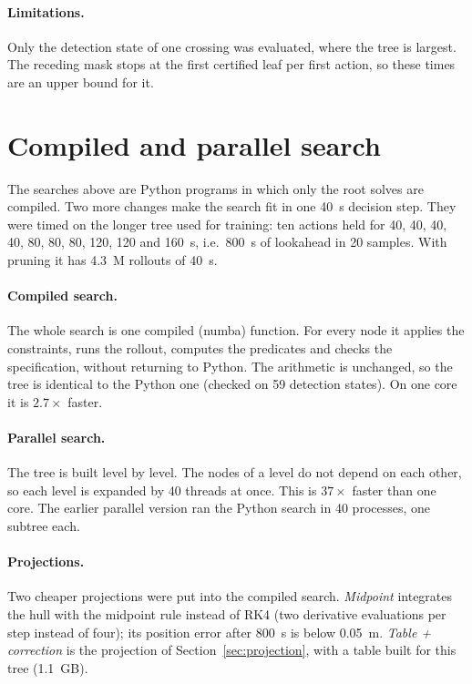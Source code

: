 \documentclass[11pt,a4paper]{article}
\begin{document}
\paragraph{Limitations.} Only the detection state of one crossing was
evaluated, where the tree is largest. The receding mask stops at the first
certified leaf per first action, so these times are an upper bound for it.

\section{Compiled and parallel search}

The searches above are Python programs in which only the root solves are
compiled. Two more changes make the search fit in one 40~s decision step.
They were timed on the longer tree used for training: ten actions held for
40, 40, 40, 40, 80, 80, 80, 120, 120 and 160~s, i.e.\ 800~s of lookahead in
20 samples. With pruning it has 4.3~M rollouts of 40~s.

\paragraph{Compiled search.} The whole search is one compiled (numba)
function. For every node it applies the constraints, runs the rollout,
computes the predicates and checks the specification, without returning to
Python. The arithmetic is unchanged, so the tree is identical to the Python
one (checked on 59 detection states). On one core it is $2.7\times$ faster.

\paragraph{Parallel search.} The tree is built level by level. The nodes of a
level do not depend on each other, so each level is expanded by 40 threads at
once. This is $37\times$ faster than one core. The earlier parallel version
ran the Python search in 40 processes, one subtree each.

\paragraph{Projections.} Two cheaper projections were put into the compiled
search. \emph{Midpoint} integrates the hull with the midpoint rule instead of
RK4 (two derivative evaluations per step instead of four); its position error
after 800~s is below 0.05~m. \emph{Table + correction} is the projection of
Section~\ref{sec:projection}, with a table built for this tree (1.1~GB).
\end{document}
